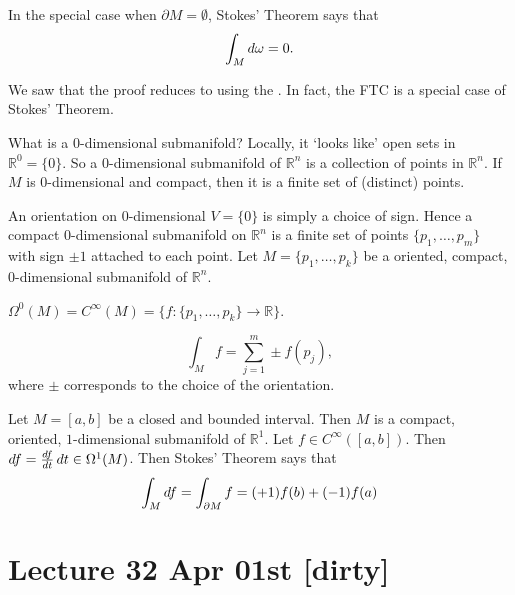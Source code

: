 \documentclass[notoc,notitlepage]{tufte-book}
\begin{document}
\begin{remark}
  In the special case when $\partial M = \emptyset$, Stokes' Theorem says that
  \begin{equation*}
    \int_{M} \mathop{}\!d{\omega} = 0. 
  \end{equation*}
\end{remark}

\begin{remark}
  We saw that the proof reduces to using the . In fact, the FTC is a special case of Stokes' Theorem.

  What is a $0$-dimensional submanifold? Locally, it `looks like' open sets in
  $\mathbb{R}^0 = \{0\}$. So a $0$-dimensional submanifold of $\mathbb{R}^n$ is a
  collection of points in $\mathbb{R}^n$. If $M$ is $0$-dimensional and compact,
  then it is a finite set of (distinct) points.

  An orientation on $0$-dimensional $V = \{0\}$ is simply a choice of sign.
  Hence a compact $0$-dimensional submanifold on $\mathbb{R}^n$ is a finite set
  of points $\{p_1, \ldots, p_m \}$ with sign $\pm 1$ attached to each point.
  Let $M = \{p_1, \ldots, p_k\}$ be a oriented, compact, $0$-dimensional
  submanifold of $\mathbb{R}^n$.

  $\Omega^0(M) = C^\infty(M) = \{ f : \{p_1, \ldots, p_k\} \to \mathbb{R} \}$.

  \begin{equation*}
    \int_{M} f = \sum_{j=1}^{m} \pm f(p_j),
  \end{equation*}
  where $\pm$ corresponds to the choice of the orientation.

  Let $M = [a, b]$ be a closed and bounded interval. Then $M$ is a compact,
  oriented, $1$-dimensional submanifold of $\mathbb{R}^1$. Let $f \in
  C^\infty([a, b])$. Then $\mathop{}\!d{f} = \frac{\mathop{}\!d{f}}{\mathop{}\!d{t}} \mathop{}\!d{t} \in
  \Omega^1(M)$. Then Stokes' Theorem says that
  \begin{equation*}
    \int_{M} \mathop{}\!d{f} = \int_{\partial M} f = (+1) f(b) + (-1) f(a)
  \end{equation*}
\end{remark}



\label{part:differential_geometry}

\chapter{Lecture 32 Apr 01st [dirty]}%
\label{chp:lecture_32_apr_01st}
\end{document}
